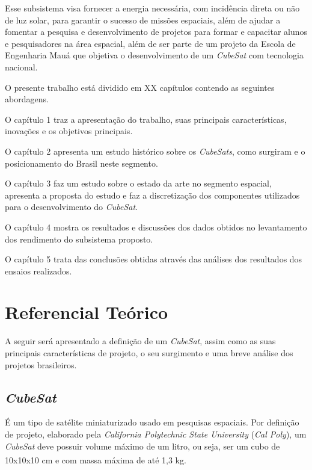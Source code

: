 \documentclass[
	12pt,				%
	openright,			%
	oneside,			%
	a4paper,			%
	english,			%
	french,				%
	spanish,			%
	brazil,				%
	oldfontcommands
	]{abntex2}
\begin{document}
	Esse subsistema visa fornecer a energia necessária, com incidência direta ou não de luz solar, para garantir o sucesso de missões espaciais, além de ajudar a fomentar a pesquisa e desenvolvimento de projetos para formar e capacitar alunos e pesquisadores na área espacial, além de ser parte de um projeto da Escola de Engenharia Mauá que objetiva o desenvolvimento de um \textit{CubeSat} com tecnologia nacional.
	
	O presente trabalho está dividido em XX capítulos contendo as seguintes abordagens.

	O capítulo 1 traz a apresentação do trabalho, suas principais características, inovações e os objetivos principais.

	O capítulo 2 apresenta um estudo histórico sobre os \textit{CubeSats}, como surgiram e o posicionamento do Brasil neste segmento. 

	O capítulo 3 faz um estudo sobre o estado da arte no segmento espacial, apresenta a proposta do estudo e faz a discretização dos componentes utilizados para o desenvolvimento do \textit{CubeSat}.

	O capítulo 4 mostra os resultados e discussões dos dados obtidos no levantamento dos rendimento do subsistema proposto.

	O capítulo 5 trata das conclusões obtidas através das análises dos resultados dos ensaios realizados. 

\chapter[Referencial Teórico]{Referencial Teórico}

	A seguir será apresentado a definição de um \textit{CubeSat}, assim como as suas principais características de projeto, o seu surgimento e uma breve análise dos projetos brasileiros. 

\section[CubeSat]{\textit{CubeSat}}

	É um tipo de satélite miniaturizado usado em pesquisas espaciais. Por definição de projeto, elaborado pela \textit{California Polytechnic State University} (\textit{Cal Poly}), um \textit{CubeSat} deve possuir volume máximo de um litro, ou seja, ser um cubo de 10x10x10 cm e com massa máxima de até 1,3 kg.\textsuperscript{\cite{CubeSat}}
	
\end{document}
